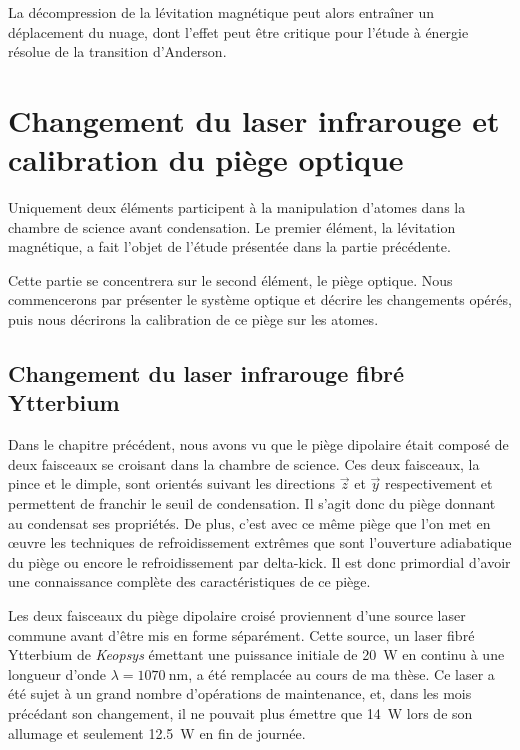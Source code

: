 La décompression de la lévitation magnétique peut alors entraîner un déplacement du nuage, dont l'effet peut être critique pour l'étude à énergie résolue de la transition d'Anderson. 

















\section{Changement du laser infrarouge et calibration du piège optique}
Uniquement deux éléments participent à la manipulation d'atomes dans la chambre de science avant condensation. Le premier élément, la lévitation magnétique, a fait l'objet de l'étude présentée dans la partie précédente. 

Cette partie se concentrera sur le second élément, le piège optique. Nous commencerons par présenter le système optique et décrire les changements opérés, puis nous décrirons la calibration de ce piège sur les atomes.

\subsection{Changement du laser infrarouge fibré Ytterbium }
Dans le chapitre précédent, nous avons vu que le piège dipolaire était composé de deux faisceaux se croisant dans la chambre de science. Ces deux faisceaux, la pince et le dimple, sont orientés suivant les directions $\vec{z}$ et $\vec{y}$ respectivement et permettent de franchir le seuil de condensation. Il s'agit donc du piège donnant au condensat ses propriétés. De plus, c'est avec ce même piège que l'on met en œuvre les techniques de refroidissement extrêmes que sont l'ouverture adiabatique du piège ou encore le refroidissement par delta-kick. Il est donc primordial d'avoir une connaissance complète des caractéristiques de ce piège.



Les deux faisceaux du piège dipolaire croisé proviennent d'une source laser commune avant d'être mis en forme séparément. Cette source, un laser fibré Ytterbium de \emph{Keopsys} émettant une puissance initiale de \SI{20}{\watt} en continu à une longueur d'onde $\lambda=\SI{1070}{\nano\metre}$, a été remplacée au cours de ma thèse. Ce laser a été sujet à un grand nombre d'opérations de maintenance, et, dans les mois précédant son changement, il ne pouvait plus émettre que \SI{14}{\watt} lors de son allumage et seulement \SI{12.5}{\watt} en fin de journée.
 
